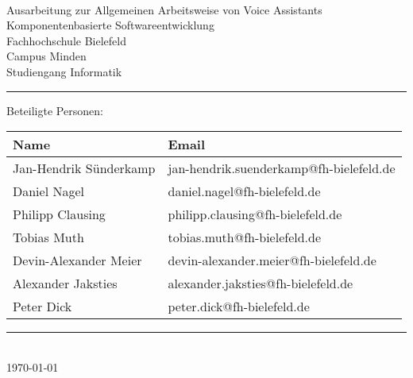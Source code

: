 
\begin{titlepage}
   \mbox{}\vspace{5\baselineskip}\\
   \sffamily\huge
   \centering
   {\Huge Ausarbeitung zur Allgemeinen Arbeitsweise von Voice Assistants} \\
  Komponentenbasierte Softwareentwicklung
   \vspace{3\baselineskip}\\
   \rmfamily\Large
  Fachhochschule Bielefeld \\
  Campus Minden \\
  Studiengang Informatik
   \vspace{2\baselineskip}\\
\noindent\rule{15cm}{0.4pt}
Beteiligte Personen:
\begin{table}[H]
	\tablestyle
	\begin{tabular}{*{2}{v{0.45\textwidth}}}
		\hline
		\textbf{Name} &
		\textbf{Email} \tabularnewline
		\hline
		Jan-Hendrik Sünderkamp & jan-hendrik.suenderkamp@fh-bielefeld.de \tabularnewline
		Daniel Nagel & daniel.nagel@fh-bielefeld.de \tabularnewline
		Philipp Clausing & philipp.clausing@fh-bielefeld.de \tabularnewline
		Tobias Muth & tobias.muth@fh-bielefeld.de \tabularnewline
		Devin-Alexander Meier  & devin-alexander.meier@fh-bielefeld.de \tabularnewline
		Alexander Jaksties & alexander.jaksties@fh-bielefeld.de \tabularnewline
		Peter Dick & peter.dick@fh-bielefeld.de \tabularnewline

	\end{tabular}
\end{table}
   \noindent\rule{15cm}{0.4pt}
      \vspace{1\baselineskip}\\
   \today
\end{titlepage}

